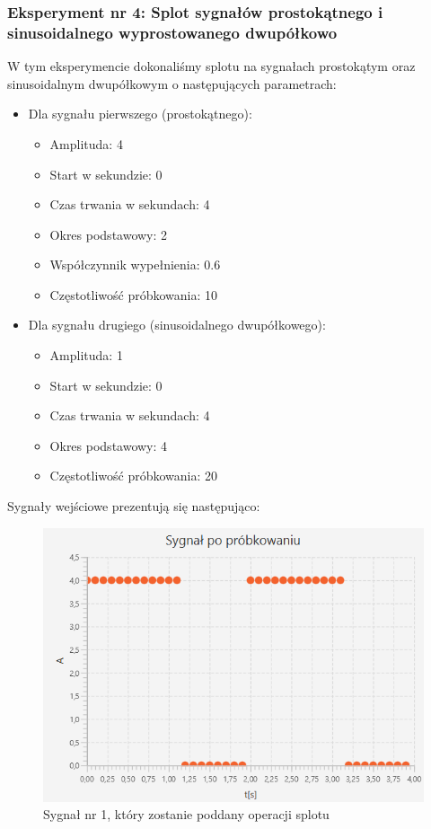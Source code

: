 \documentclass[12pt]{article}
\begin{document}
\subsubsection{Eksperyment nr 4: Splot sygnałów prostokątnego i sinusoidalnego wyprostowanego dwupółkowo}
W tym eksperymencie dokonaliśmy splotu na sygnałach prostokątym oraz sinusoidalnym dwupółkowym o następujących parametrach:
\begin{itemize}
    \item Dla sygnału pierwszego (prostokątnego):
    \begin{itemize}
        \item Amplituda: 4
        \item Start w sekundzie: 0
        \item Czas trwania w sekundach: 4
        \item Okres podstawowy: 2
        \item Współczynnik wypełnienia: 0.6
        \item Częstotliwość próbkowania: 10
    \end{itemize}
    \item Dla sygnału drugiego (sinusoidalnego dwupółkowego): 
    \begin{itemize}
        \item Amplituda: 1 
        \item Start w sekundzie: 0 
        \item Czas trwania w sekundach: 4
        \item Okres podstawowy: 4
        \item Częstotliwość próbkowania: 20
    \end{itemize}
\end{itemize}
Sygnały wejściowe prezentują się następująco:
\begin{figure}[H]
    \centering
	\includegraphics[width=\linewidth]{sygnal_po_probkowaniu_4.1.png}
    \caption{Sygnał nr 1, który zostanie poddany operacji splotu}
    \label{Sygnał_4.1}
\end{figure}
\end{document}
